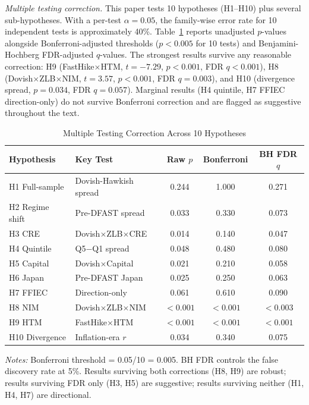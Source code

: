 \documentclass[12pt,a4paper]{article}
\begin{document}
\textit{Multiple testing correction.} This paper tests 10 hypotheses (H1--H10) plus several sub-hypotheses. With a per-test $\alpha = 0.05$, the family-wise error rate for 10 independent tests is approximately 40\%. Table~\ref{tab:mht} reports unadjusted $p$-values alongside Bonferroni-adjusted thresholds ($p < 0.005$ for 10 tests) and Benjamini-Hochberg FDR-adjusted $q$-values. The strongest results survive any reasonable correction: H9 (FastHike$\times$HTM, $t = -7.29$, $p < 0.001$, FDR $q < 0.001$), H8 (Dovish$\times$ZLB$\times$NIM, $t = 3.57$, $p < 0.001$, FDR $q = 0.003$), and H10 (divergence spread, $p = 0.034$, FDR $q = 0.057$). Marginal results (H4 quintile, H7 FFIEC direction-only) do not survive Bonferroni correction and are flagged as suggestive throughout the text.

\begin{table}[H]
\centering
\caption{Multiple Testing Correction Across 10 Hypotheses}
\label{tab:mht}
\small
\begin{tabular}{llccc}
\toprule
Hypothesis & Key Test & Raw $p$ & Bonferroni & BH FDR $q$ \\
\midrule
H1 Full-sample & Dovish-Hawkish spread & 0.244 & 1.000 & 0.271 \\
H2 Regime shift & Pre-DFAST spread & 0.033 & 0.330 & 0.073 \\
H3 CRE & Dovish$\times$ZLB$\times$CRE & 0.014 & 0.140 & 0.047 \\
H4 Quintile & Q5$-$Q1 spread & 0.048 & 0.480 & 0.080 \\
H5 Capital & Dovish$\times$Capital & 0.021 & 0.210 & 0.058 \\
H6 Japan & Pre-DFAST Japan & 0.025 & 0.250 & 0.063 \\
H7 FFIEC & Direction-only & 0.061 & 0.610 & 0.090 \\
H8 NIM & Dovish$\times$ZLB$\times$NIM & $<0.001$ & $<0.001$ & $<0.003$ \\
H9 HTM & FastHike$\times$HTM & $<0.001$ & $<0.001$ & $<0.001$ \\
H10 Divergence & Inflation-era $r$ & 0.034 & 0.340 & 0.075 \\
\bottomrule
\end{tabular}
\end{table}
\noindent\textit{Notes:} Bonferroni threshold = 0.05/10 = 0.005. BH FDR controls the false discovery rate at 5\%. Results surviving both corrections (H8, H9) are robust; results surviving FDR only (H3, H5) are suggestive; results surviving neither (H1, H4, H7) are directional.
\end{document}
